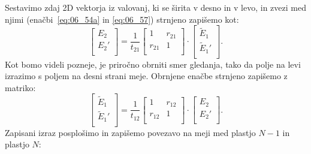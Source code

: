 Sestavimo zdaj 2D vektorja iz valovanj, ki se širita v desno in v levo, in zvezi
med njimi (enačbi~\ref{eq:06_54a} in \ref{eq:06_57}) strnjeno zapišemo kot:
\begin{equation}
\left[\begin{array}{c}
E_{2}\\
E_{2}'\\
\end{array}\right] =
\frac{1}{t_{21}}
\left[\begin{array}{cc}
1& r_{21}\\
r_{21}& 1\\
\end{array}\right]\cdot
\left[\begin{array}{c}
\tilde{E}_1\\
\tilde{E}_1'\\
\end{array}\right]\!\!.
\label{eq:06_58}
\end{equation}
Kot bomo videli pozneje, je priročno obrniti smer gledanja, tako da polje na 
levi izrazimo s poljem na desni strani meje. Obrnjene enačbe strnjeno zapišemo z matriko:
\begin{equation}
\left[\begin{array}{c}
\tilde{E}_{1}\\
\tilde{E}_{1}'\\
\end{array}\right] =
\frac{1}{t_{12}}
\left[\begin{array}{cc}
1& r_{12}\\
r_{12}& 1\\
\end{array}\right]\cdot
\left[\begin{array}{c}
E_2\\
E_2'\\
\end{array}\right]\!\!.
\label{eq:06_59}
\end{equation}
Zapisani izraz posplošimo in zapišemo povezavo na meji med plastjo 
$N-1$ in plastjo $N$:

